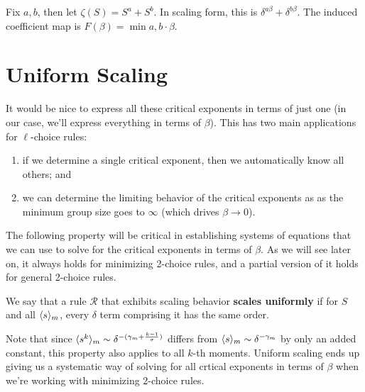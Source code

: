 \documentclass[twoside,10pt]{article}
\begin{document}
\begin{ex}
	Fix $a, b$, then let $\zeta(S) = S^{a} + S^{b}$. In scaling form, this is $\delta^{a \beta} + \delta^{b \beta}$. The induced coefficient map is $F(\beta) = \min{a,b} \cdot \beta$.
\end{ex}

\section{Uniform Scaling}

It would be nice to express all these critical exponents in terms of just one (in our case, we'll express everything in terms of $\beta$). This has two main applications for $\ell$-choice rules:
\begin{enumerate}
	\item if we determine a single critical exponent, then we automatically know all others; and
	\item we can determine the limiting behavior of the critical exponents as as the minimum group size goes to $\infty$ (which drives $\beta\to 0$).
\end{enumerate}
The following property will be critical in establishing systems of equations that we can use to solve for the critical exponents in terms of $\beta$. As we will see later on, it always holds for minimizing 2-choice rules, and a partial version of it holds for general 2-choice rules.

\begin{defn}[]
	We say that a rule $\mathcal{R}$ that exhibits scaling behavior \textbf{scales uniformly} if for $S$ and all $\langle s \rangle_{m}$, every $\delta$ term comprising it has the same order. 
\end{defn}

Note that since $\langle s^{k} \rangle_{m} \sim \delta^{-(\gamma_{m} + \frac{k-1}{\sigma})}$ differs from $\langle s \rangle_{m} \sim \delta^{-\gamma_{m}}$ by only an added constant, this property also applies to all $k$-th moments. Uniform scaling ends up giving us a systematic way of solving for all crtical exponents in terms of $\beta$ when we're working with minimizing 2-choice rules.

\end{document}
